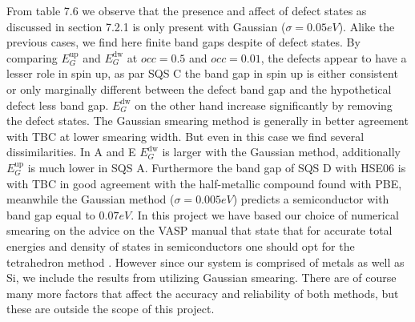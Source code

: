 From table 7.6 we observe that the presence and affect of defect states as discussed in section 7.2.1 is only present with Gaussian ($\sigma = 0.05 eV$). Alike the previous cases, we find here finite band gaps despite of defect states. By comparing $E_G ^\text{up}$ and $E_G ^\text{dw}$ at $occ = 0.5$ and $occ = 0.01$, the defects appear to have a lesser role in spin up, as par SQS C the band gap in spin up is either consistent or only marginally different between the defect band gap and the hypothetical defect less band gap. $E_G ^\text{dw}$ on the other hand increase significantly by removing the defect states. The Gaussian smearing method is generally in better agreement with TBC at lower smearing width. But even in this case we find several dissimilarities. In A and E $E_G ^\text{dw}$ is larger with the Gaussian method, additionally $E_G ^\text{up}$ is much lower in SQS A. Furthermore the band gap of SQS D with HSE06 is with TBC in good agreement with the half-metallic compound found with PBE, meanwhile the Gaussian method ($\sigma = 0.005 eV$) predicts a semiconductor with band gap equal to $0.07 eV$. In this project we have based our choice of numerical smearing on the advice on the VASP manual that state that for accurate total energies and density of states in semiconductors one should opt for the tetrahedron method \cite{ismear}.  However since our system is comprised of metals as well as Si, we include the results from utilizing Gaussian smearing. There are of course many more factors that affect the accuracy and reliability of both methods, but these are outside the scope of this project.

